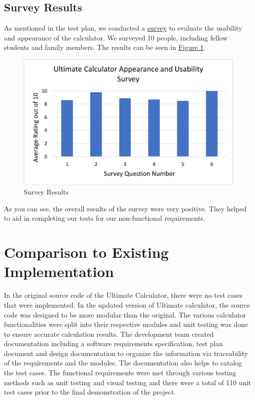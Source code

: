 \documentclass[12pt, titlepage]{article}
\begin{document}
\subsection{Survey Results}
\label{sec:surveyR}

As mentioned in the test plan, we conducted a \hyperref[sec:survey]{survey} to evaluate the usability and appearance of the calculator. We surveyed 10 people, including fellow students and family members. The results can be seen in \hyperref[calc]{Figure 1}.

\begin{figure}[H]
    \centering
    \includegraphics[scale=0.9]{surveyResults.png}
    \caption{Survey Results}
    \label{calc}
\end{figure}

As you can see, the overall results of the survey were very positive. They helped to aid in completing our tests for our non-functional requirements.
	
\section{Comparison to Existing Implementation}	

In the original source code of the Ultimate Calculator, there were no test cases that were implemented. In the updated version of Ultimate calculator, the source code was designed to be more modular than the original. The various calculator functionalities were split into their respective modules and unit testing was done to ensure accurate calculation results. The development team created documentation including a software requirements specification, test plan document and design documentation to organize the information via traceability of the requirements and the modules. The documentation also helps to catalog the test cases. The functional requirements were met through various testing methods such as unit testing and visual testing and there were a total of 110 unit test cases prior to the final demonstration of the project. 
\end{document}
